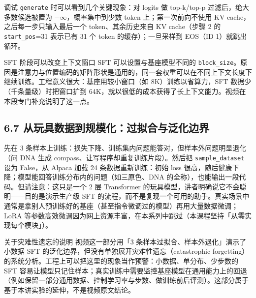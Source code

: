 调试 \texttt{generate} 时可以看到几个关键现象：对 logits 做 top-k/top-p 过滤后，绝大多数候选被置为 $-\infty$，概率集中到少数 token 上；第一次前向不使用 KV cache，之后每一步只输入最后一个 token、其余历史来自 KV cache（步骤 2 的 \texttt{start\_pos}=31 表示已有 31 个 token 的缓存）；一旦采样到 EOS（ID 1）就跳出循环。

\begin{importantbox}{SFT 阶段可以改变上下文窗口}
SFT 可以设置与基座模型不同的 \texttt{block\_size}。原因是注意力与位置编码的矩阵形状是通用的，同一套权重可以在不同上下文长度下继续训练。工程意义很大：基座用较小窗口（如 8K）训练以省算力，SFT 数据少（千条量级）时把窗口扩到 64K，就以很低的成本获得了长上下文能力。视频在本段专门补充说明了这一点。
\end{importantbox}

\subsection{6.7 从玩具数据到规模化：过拟合与泛化边界}

先在 3 条样本上训练：损失下降、训练集内问题能答对，但样本外问题明显退化（问 DNA 生成 compass、让写程序却重复训练片段）。然后把 \texttt{sample\_dataset} 设为 False，从 Alpaca 加载 24 条数据重新训练：初始 loss 很高，随后健康下降；模型能回答训练分布内的问题（如三原色、DNA 的全称），也能输出一段代码。但请注意：这只是一个 2 层 Transformer 的玩具模型，讲者明确说它不会聪明——目的是演示生产级 SFT 的流程，而不是复现一个可用的助手。真实场景中通常是拿别人预训练好的基座（甚至指令微调过的模型）再用大量数据微调；LoRA 等参数高效微调因为网上资源丰富，在本系列中跳过（本课程坚持「从零实现每个模块」）。

\begin{knowledgebox}{关于灾难性遗忘的说明}
视频这一部分用「3 条样本过拟合、样本外退化」演示了小数据 SFT 的泛化边界，但没有单独展开灾难性遗忘（catastrophic forgetting）的系统分析。工程上可以把这里的现象当作预警：小数据、单分布、少步数的 SFT 容易让模型只记住样本；真实训练中需要监控基座模型在通用能力上的回退（例如保留一部分通用数据、控制学习率与步数、做训练前后评测）。这部分属于基于本讲实验的延伸，不是视频原文结论。
\end{knowledgebox}

